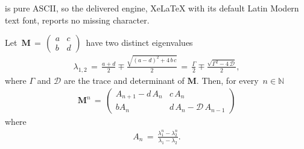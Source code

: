 \documentclass[10pt,a4paper]{amsart}
\def\mM{{\bm{M}}}
\begin{document}
is pure ASCII, so the delivered engine, XeLaTeX with its default Latin Modern text font, reports no missing character.
\begin{proposition}\label{pro-1}
Let $\,\mM \, = \, \begin{pmatrix}
a & c \\[1ex]
b & d
\end{pmatrix}\,$ have two distinct eigenvalues
\begin{align}\label{}
\lambda_{1,2} \, = \, \frac{a+d}{2} \mp \frac{\sqrt{(a-d)^2+4\, b \, c}}{2} \, = \, \frac{\Gamma}{2} \mp \frac{\sqrt{\Gamma^2-4\,\mathcal{D}}}{2},   
\end{align}
where $\Gamma$ and $\mathcal{D}$ are the trace and determinant of $\mM$. Then, for every $\,n \in \mathbb{N}$\\
\begin{align}\label{M-n}
\mM^n \, = \, 
%
\begin{pmatrix}
A_{n+1} -d\,A_n & c\, A_n \\[1ex]
%
b A_n &  d\,A_n - \mathcal{D}\, A_{n-1}
\end{pmatrix}
\end{align}
where 
\begin{align}\label{An}
A_n \, = \,\frac{\lambda_1^n-\lambda_2^n}{\lambda_1 - \lambda_2}.
\end{align}
%
\end{proposition}
\end{document}
